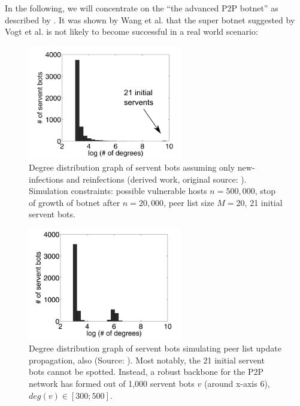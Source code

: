 \documentclass{llncs}
\begin{document}
In the following, we will concentrate on the ``the advanced P2P
botnet'' as described by \cite{td1sc}. It was shown by Wang et
al. \cite{td1sc} that the super botnet suggested by Vogt et al. is not
likely to become successful in a real world scenario:

\begin{figure}[htbp]
  \centering
  
    \includegraphics[width=0.6\textwidth]{figures/distributiongraph.png}
  
  \caption{Degree distribution graph of servent bots assuming only new-infections and reinfections (derived work, original source: \cite{td1sc}). Simulation constraints: possible vulnerable hosts $n=500,000$, stop of growth of botnet after $n=20,000$, peer list size $M=20$, 21 initial servent bots.}
  \label{distributiongraph}
\end{figure}

\begin{figure}[htbp]
  \centering
  
    \includegraphics[width=0.6\textwidth]{figures/distributiongraph2.png}
  
  \caption{Degree distribution graph of servent bots simulating peer list update propagation, also (Source: \cite{td1sc}). Most notably, the 21 initial servent bots cannot be spotted. Instead, a robust backbone for the P2P network has formed out of 1,000 servent bots $v$ (around x-axis 6), $deg(v) \in [300;500]$.}
  \label{distributiongraph2}
\end{figure}
\end{document}
